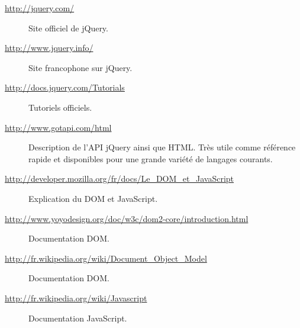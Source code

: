 \documentclass[10pt,a4paper,titlepage]{article}
\begin{document}
\small
\begin{description}
	\item[\url{http://jquery.com/}] {Site officiel de jQuery.}
	\item[\url{http://www.jquery.info/}] {Site francophone sur jQuery.}
	\item[\url{http://docs.jquery.com/Tutorials}] {Tutoriels officiels.}
	\item[\url{http://www.gotapi.com/html}] {Description de l'API jQuery ainsi que HTML. Très utile comme référence rapide et disponibles pour une grande variété de langages courants.}
	\item[\url{http://developer.mozilla.org/fr/docs/Le_DOM_et_JavaScript}] {Explication du DOM et JavaScript.}
	\item[\url{http://www.yoyodesign.org/doc/w3c/dom2-core/introduction.html}] {Documentation DOM.}
	\item[\url{http://fr.wikipedia.org/wiki/Document_Object_Model}] {Documentation DOM.}
	\item[\url{http://fr.wikipedia.org/wiki/Javascript}] {Documentation JavaScript.}
\end{description}
\end{document}
